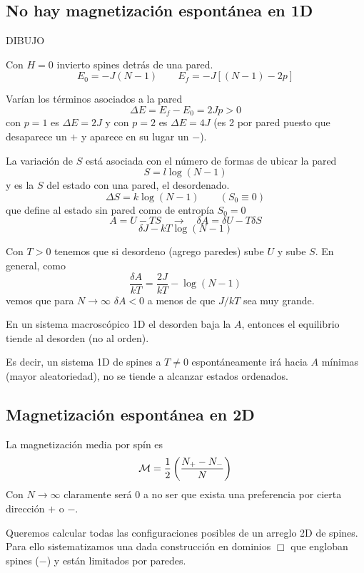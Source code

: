 \documentclass[10pt,oneside]{CBFT_book}
\begin{document}
\subsection{No hay magnetización espontánea en 1D}


DIBUJO 

Con $H=0$ invierto spines detrás de una pared.
\[
	E_0 = -J(N-1) \qquad E_f = -J[(N-1)-2p]
\]

Varían los términos asociados a la pared
\[
	\Delta E = E_f - E_0 = 2Jp > 0
\]
con $p=1$ es $\Delta E = 2J$ y con $p=2$ es $\Delta E = 4J$ (es 2 por pared puesto que desaparece un $+$ y aparece
en su lugar un $-$).

La variación de $S$ está asociada con el número de formas de ubicar la pared
\[
	S = l \log (N-1)
\]
y es la $S$ del estado con una pared, el desordenado.
\[
	\Delta S = k \log(N-1)	\qquad (S_0 \equiv 0)
\]
que define al estado sin pared como de entropía $S_0=0$
\[
	A = U - TS \quad \rightarrow \quad \delta A = \delta U - T \delta S
\]
\[
	\delta J - kT \log(N-1)
\]

Con $T > 0$ tenemos que si desordeno (agrego paredes) sube $U$ y sube $S$.
En general, como 
\[
	\frac{\delta A}{kT} = \frac{2J}{kT} - \log(N-1)
\]
vemos que para $N\to\infty$ $\delta A < 0$ a menos de que $J/kT$ sea muy grande.


En un sistema macroscópico 1D el desorden baja la $A$, entonces el equilibrio tiende
al desorden (no al orden).

Es decir, un sistema 1D de spines a $ T \neq 0 $ espontáneamente irá hacia $ A $
mínimas (mayor aleatoriedad), no se tiende a alcanzar estados ordenados.

\subsection{Magnetización espontánea en 2D}

La magnetización media por spín es
\[
	\mathcal{M} = \frac{1}{2} \left( \frac{ N_+ - N_- }{ N } \right)
\]
Con $N\to\infty$ claramente será 0 a no ser que exista una preferencia por cierta dirección $+$ o $-$.

Queremos calcular todas las configuraciones posibles de un arreglo 2D de spines.
Para ello sistematizamos una dada construcción en dominios $\Box$ que engloban spines ($-$) y están
limitados por paredes.
\end{document}

